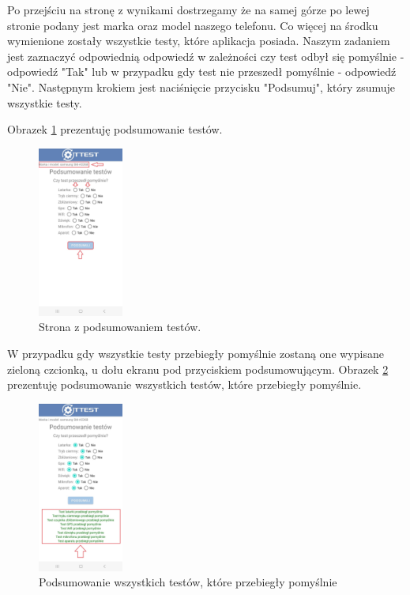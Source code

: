 Po przejściu na stronę z wynikami dostrzegamy że na samej górze po lewej stronie podany jest marka oraz model naszego telefonu. Co więcej na środku wymienione zostały wszystkie testy, które aplikacja posiada. Naszym zadaniem jest zaznaczyć odpowiednią odpowiedź w zależności czy test odbył się pomyślnie - odpowiedź "Tak" lub w przypadku gdy test nie przeszedł pomyślnie - odpowiedź "Nie". Następnym krokiem jest naciśnięcie przycisku "Podsumuj", który zsumuje wszystkie testy.

\newpage


Obrazek \ref{rys:wyniki} prezentuję podsumowanie testów.

\begin{figure}[!hbt]
	\begin{center}
		\includegraphics[angle=360, width=0.25\textwidth]{rys/punkt6/wyniki}
		\caption{Strona z podsumowaniem testów.}
		\label{rys:wyniki}
	\end{center}
\end{figure}

W przypadku gdy wszystkie testy przebiegły pomyślnie zostaną one wypisane zieloną czcionką, u dołu ekranu pod przyciskiem podsumowującym.
\newline
Obrazek \ref{rys:wyniki1} prezentuję podsumowanie wszystkich testów, które przebiegły pomyślnie.

\begin{figure}[!hbt]
	\begin{center}
		\includegraphics[angle=360, width=0.25\textwidth]{rys/punkt6/wyniki1}
		\caption{Podsumowanie wszystkich testów, które przebiegły pomyślnie}
		\label{rys:wyniki1}
	\end{center}
\end{figure}


